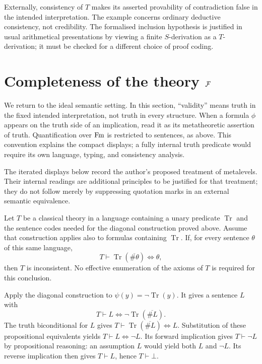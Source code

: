Externally, consistency of $T$ makes its asserted provability of
contradiction false in the intended interpretation. The example concerns
ordinary deductive consistency, not credibility. The formalised inclusion
hypothesis is justified in usual arithmetical presentations by viewing a
finite $S$-derivation as a $T$-derivation; it must be checked for a different
choice of proof coding.

\pagebreak
\section{\texorpdfstring{Completeness of the theory ${\mathcal{F}}$}{Completeness of the theory F}}
We return to the ideal semantic setting. In this section, ``validity'' means
truth in the fixed intended interpretation, not truth in every structure.
When a formula $\phi$ appears on the truth side of an implication, read it as
its metatheoretic assertion of truth. Quantification over $\mathrm{Fm}$ is restricted
to sentences, as above. This convention explains the compact displays; a
fully internal truth predicate would require its own language, typing, and
consistency analysis.

The iterated displays below record the author's proposed treatment of
metalevels. Their internal readings are additional principles to be justified
for that treatment; they do not follow merely by suppressing quotation marks
in an external semantic equivalence.

\begin{proposition}
\label{prop:internal_truth_obstruction}
Let $T$ be a classical theory in a language containing a unary predicate
$\operatorname{Tr}$ and the sentence codes needed for the diagonal
construction proved above. Assume that construction applies also to
formulas containing $\operatorname{Tr}$. If, for every sentence $\theta$
of this same language,
\[
T\vdash\operatorname{Tr}(\overline{\#\theta})\iff\theta,
\]
then $T$ is inconsistent. No effective enumeration of the axioms of $T$
is required for this conclusion.
\end{proposition}
\Proof
Apply the diagonal construction to
$\psi(y)=\neg\operatorname{Tr}(y)$. It gives a sentence $L$ with
\[
T\vdash L\iff\neg\operatorname{Tr}(\overline{\#L}).
\]
The truth biconditional for $L$ gives
$T\vdash\operatorname{Tr}(\overline{\#L})\iff L$.
Substitution of these propositional equivalents yields
$T\vdash L\iff\neg L$. Its forward implication gives
$T\vdash\neg L$ by propositional reasoning: an assumption $L$
would yield both $L$ and $\neg L$. Its reverse implication then gives
$T\vdash L$, hence $T\vdash\bot$.
\Done

